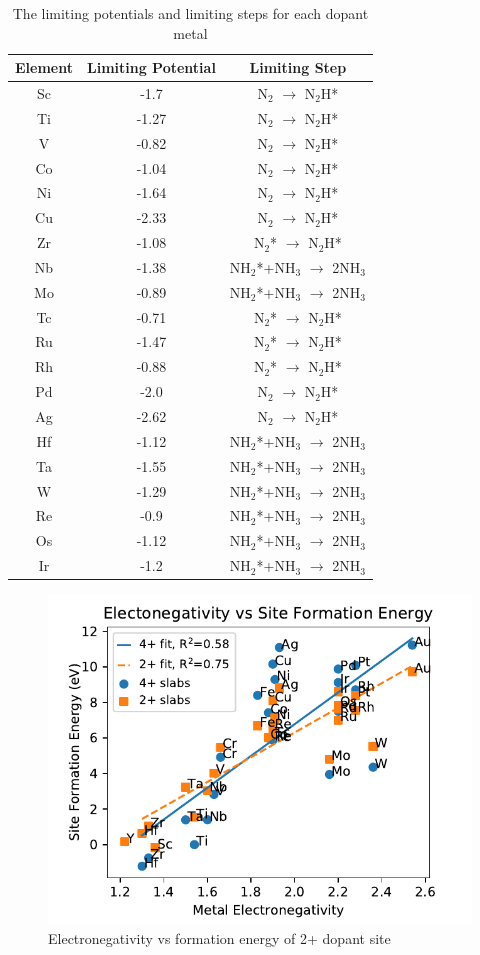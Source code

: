 \begin{table}
\begin{center}
\begin{tabular}{| c | c |c |}
\hline
Element & Limiting Potential & Limiting Step \\
\hline
Sc & -1.7 & N$_2$ $\rightarrow$ N$_2$H*\\
Ti & -1.27 & N$_2$ $\rightarrow$ N$_2$H*\\
V & -0.82 & N$_2$ $\rightarrow$ N$_2$H*\\
Co & -1.04 & N$_2$ $\rightarrow$ N$_2$H*\\
Ni & -1.64 & N$_2$ $\rightarrow$ N$_2$H*\\
Cu & -2.33 & N$_2$ $\rightarrow$ N$_2$H*\\
Zr & -1.08 & N$_2$* $\rightarrow$ N$_2$H*\\
Nb & -1.38 & NH$_2$*+NH$_3$ $\rightarrow$ 2NH$_3$\\
Mo & -0.89 & NH$_2$*+NH$_3$ $\rightarrow$ 2NH$_3$\\
Tc & -0.71 & N$_2$* $\rightarrow$ N$_2$H*\\
Ru & -1.47 & N$_2$* $\rightarrow$ N$_2$H*\\
Rh & -0.88 & N$_2$* $\rightarrow$ N$_2$H*\\
Pd & -2.0 & N$_2$ $\rightarrow$ N$_2$H*\\
Ag & -2.62 & N$_2$ $\rightarrow$ N$_2$H*\\
Hf & -1.12 & NH$_2$*+NH$_3$ $\rightarrow$ 2NH$_3$\\
Ta & -1.55 & NH$_2$*+NH$_3$ $\rightarrow$ 2NH$_3$\\
W & -1.29 & NH$_2$*+NH$_3$ $\rightarrow$ 2NH$_3$\\
Re & -0.9 & NH$_2$*+NH$_3$ $\rightarrow$ 2NH$_3$\\
Os & -1.12 & NH$_2$*+NH$_3$ $\rightarrow$ 2NH$_3$\\
Ir & -1.2 & NH$_2$*+NH$_3$ $\rightarrow$ 2NH$_3$\\
\hline
\end{tabular}
\end{center}
\caption{The limiting potentials and limiting steps for each dopant metal}\label{table:limiting_steps}\end{table}\begin{figure}
\centering
\includegraphics[width=0.8\linewidth]{Images/electronegativity_vs_formation.pdf}
\caption{Electronegativity vs formation energy of 2+ dopant site}
\end{figure}

